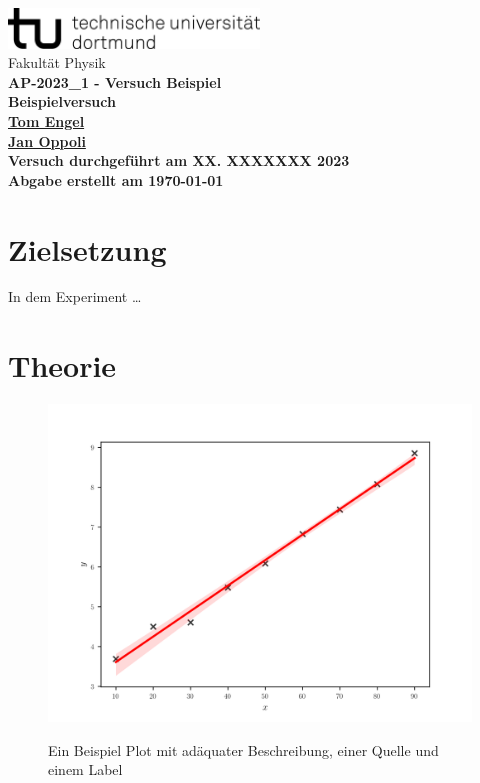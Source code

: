 \documentclass[12pt]{article}
\begin{document}
\begin{titlepage}
  \centering
  \vspace*{1cm}
  \includegraphics[width=0.5\textwidth]{Ressourcen/tud_logo_schwarz(RGB)}\\
  \vspace*{0.25cm}
  \large\textmd{Fakultät Physik} \\
  \vspace*{6cm}
  \huge \bfseries AP-2023\_1 - Versuch Beispiel \\
  \vspace*{0.25cm}
  \large Beispielversuch \\
  \vspace*{0.25cm}
  \large\textmd{\href{mailto:tom.engel@tu-dortmund.de}{Tom Engel}} \\
  \large\textmd{\href{mailto:tom.engel@tu-dortmund.de}{Jan Oppoli}} \\
  \vfill
  \small\textmd{Versuch durchgeführt am XX. XXXXXXX 2023}\\
  \small\textmd{Abgabe erstellt am \today}
\end{titlepage}
\tableofcontents
\newpage

\section{Zielsetzung}
In dem Experiment \ldots

\section{Theorie}

\begin{figure}[H]
  \centering
  \includegraphics[scale=0.5]{Ressourcen/VBeispiel_plot.svg}
  \caption{Ein Beispiel Plot mit adäquater Beschreibung, einer Quelle und einem Label}\cite{anleitung}\label{fig:1}
\end{figure}
\end{document}
